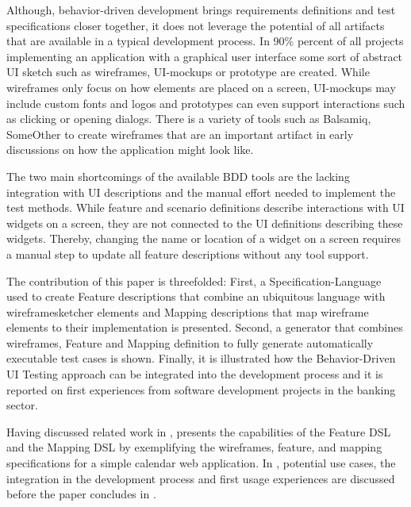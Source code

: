 \documentclass{sig-alternate-05-2015}
\begin{document}
Although, behavior-driven development brings requirements definitions and test specifications closer together, it does not leverage the potential of all artifacts that are available in a typical development process.
In 90\% percent of all projects implementing an application with a graphical user interface some sort of abstract UI sketch such as wireframes, UI-mockups or prototype are created.
While wireframes only focus on how elements are placed on a screen, UI-mockups may include custom fonts and logos and prototypes can even support interactions such as clicking or opening dialogs. 
There is a variety of tools such as Balsamiq, SomeOther to create wireframes that are an important artifact in early discussions on how the application might look like.

The two main shortcomings of the available BDD tools are the lacking integration with UI descriptions and the manual effort needed to implement the test methods.
While feature and scenario definitions describe interactions with UI widgets on a screen, they are not connected to the UI definitions describing these widgets.
Thereby, changing the name or location of a widget on a screen requires a manual step to update all feature descriptions without any tool support.

The contribution of this paper is threefolded:
First, a Specification-Language used to create Feature descriptions that combine an ubiquitous language with wireframesketcher elements and Mapping descriptions that map wireframe elements to their implementation is presented.
Second, a generator that combines wireframes, Feature and Mapping definition to fully generate automatically executable test cases is shown.
Finally, it is illustrated how the Behavior-Driven UI Testing approach can be integrated into the development process and it is reported on first experiences from software development projects in the banking sector.


Having discussed related work in ,  presents the capabilities of the Feature DSL and the Mapping DSL by exemplifying the wireframes, feature, and mapping specifications for a simple calendar web application.
In , potential use cases, the integration in the development process and first usage experiences are discussed before the paper concludes in .
\end{document}

